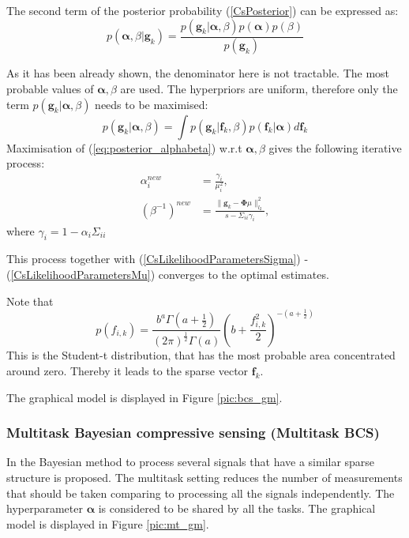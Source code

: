 \documentclass[conference]{IEEEtran}
\begin{document}
The second term of the posterior probability (\ref{CsPosterior}) can be expressed as:
\begin{equation}
p(\boldsymbol\alpha, \beta | \mathbf{g}_k) = \frac{p(\mathbf{g}_k | \boldsymbol\alpha, \beta) p(\boldsymbol\alpha) p(\beta)}{p(\mathbf{g}_k)}
\end{equation}

As it has been already shown, the denominator here is not tractable. The most probable values of $\boldsymbol\alpha, \beta$ are used. The hyperpriors are uniform, therefore only the term $p(\mathbf{g}_k | \boldsymbol\alpha, \beta)$ needs to be maximised:
\begin{equation}
\label{eq:posterior_alphabeta}
p(\mathbf{g}_k | \boldsymbol\alpha, \beta) = \int p(\mathbf{g}_k |\mathbf{f}_k, \beta) p(\mathbf{f}_k | \boldsymbol\alpha) d\mathbf{f}_k
\end{equation}
Maximisation of (\ref{eq:posterior_alphabeta}) w.r.t $\boldsymbol\alpha, \beta$ gives the following iterative process:
\begin{align}
\alpha_{i}^{new} &= \frac{\gamma_i}{\mu_i^2}, \\
(\beta^{-1})^{new} &= \frac{\|\mathbf{g}_k - \mathbf{\Phi}\mu\|^2_{l_2}}{s-\Sigma_{ii}\gamma_i},
\end{align}
where $\gamma_i = 1 - \alpha_i\Sigma_{ii}$

This process together with (\ref{CsLikelihoodParametersSigma}) - (\ref{CsLikelihoodParametersMu}) converges to the optimal estimates.

Note that 
\begin{equation}
p(f_{i, k}) = \frac{b^a\Gamma\left(a+\frac{1}{2}\right)}{(2\pi)^{\frac{1}{2}}\Gamma(a)}\left(b + \frac{f_{i, k}^{2}}{2}\right)^{-\left(a+\frac{1}{2}\right)}
\end{equation} 
This is the Student-t distribution, that has the most probable area concentrated around zero. Thereby it leads to the sparse vector $\mathbf{f}_k$.

The graphical model is displayed in Figure \ref{pic:bcs_gm}.

\subsubsection{Multitask Bayesian compressive sensing (Multitask BCS)}
In \cite{Carin2009mcs} the Bayesian method to process several signals that have a similar sparse structure is proposed. The multitask setting reduces the number of measurements that should be taken comparing to processing all the signals independently. The hyperparameter $\boldsymbol\alpha$ is considered to be shared by all the tasks. The graphical model is displayed in Figure \ref{pic:mt_gm}. 
\end{document}

